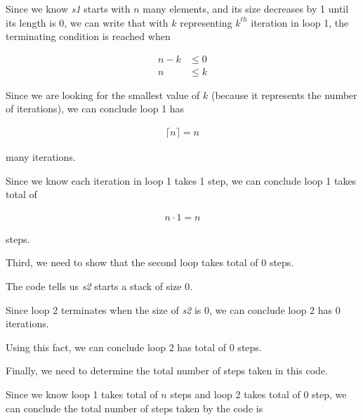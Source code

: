 \documentclass[12pt]{article}
\begin{document}
\begin{enumerate}[a.]
\begin{mdframed}
\begin{mdframed}
        \bigskip

        Since we know \textit{s1} starts with $n$ many elements, and its size decreases
        by 1 until its length is 0, we can write that with $k$ representing
        $k^{th}$ iteration in loop 1, the terminating condition is reached when

        \begin{align}
            n - k &\leq 0\\
            n &\leq k
        \end{align}

        \bigskip

        Since we are looking for the smallest value of $k$ (because it represents
        the number of iterations), we can conclude loop 1 has

        \begin{align}
            \lceil n \rceil = n
        \end{align}

        many iterations.

        \bigskip

        Since we know each iteration in loop 1 takes 1 step, we can conclude
        loop 1 takes total of

        \begin{align}
            n \cdot 1 = n
        \end{align}

        steps.

        \bigskip

        Third, we need to show that the second loop takes total of 0 steps.

        \bigskip

        The code tells us \textit{s2} starts a stack of size 0.

        \bigskip

        Since loop 2 terminates when the size of \textit{s2} is 0,
        we can conclude loop 2 has 0 iterations.

        \bigskip

        Using this fact, we can conclude loop 2 has total of 0 steps.

        \bigskip

        Finally, we need to determine the total number of steps taken in this code.

        \bigskip

        Since we know loop 1 takes total of $n$ steps and loop 2 takes total of 0 step, we can
        conclude the total number of steps taken by the code is


\end{mdframed}
\end{mdframed}
\end{enumerate}
\end{document}
